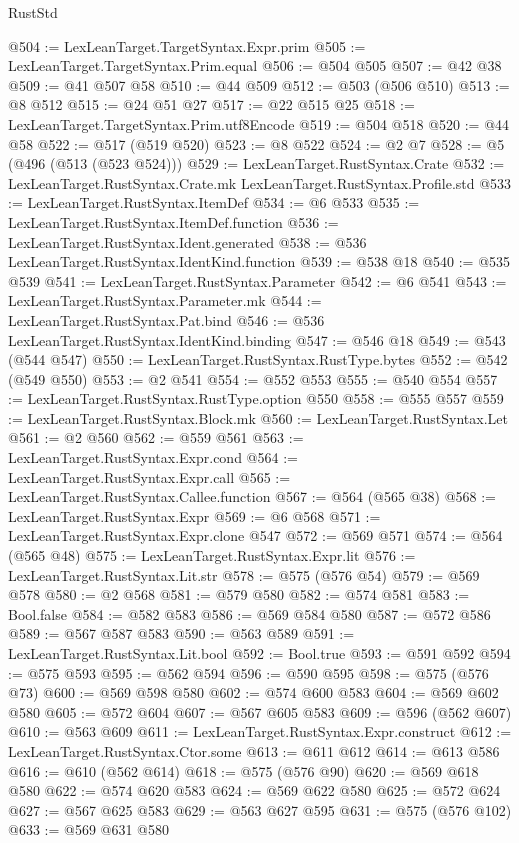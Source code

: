 \begin{lexlean}{RustStd}
\begin{coremodule}
@504 := LexLeanTarget.TargetSyntax.Expr.prim
@505 := LexLeanTarget.TargetSyntax.Prim.equal
@506 := @504 @505
@507 := @42 @38
@509 := @41 @507 @58
@510 := @44 @509
@512 := @503 (@506 @510)
@513 := @8 @512
@515 := @24 @51 @27
@517 := @22 @515 @25
@518 := LexLeanTarget.TargetSyntax.Prim.utf8Encode
@519 := @504 @518
@520 := @44 @58
@522 := @517 (@519 @520)
@523 := @8 @522
@524 := @2 @7
@528 := @5 (@496 (@513 (@523 @524)))
@529 := LexLeanTarget.RustSyntax.Crate
@532 := LexLeanTarget.RustSyntax.Crate.mk LexLeanTarget.RustSyntax.Profile.std
@533 := LexLeanTarget.RustSyntax.ItemDef
@534 := @6 @533
@535 := LexLeanTarget.RustSyntax.ItemDef.function
@536 := LexLeanTarget.RustSyntax.Ident.generated
@538 := @536 LexLeanTarget.RustSyntax.IdentKind.function
@539 := @538 @18
@540 := @535 @539
@541 := LexLeanTarget.RustSyntax.Parameter
@542 := @6 @541
@543 := LexLeanTarget.RustSyntax.Parameter.mk
@544 := LexLeanTarget.RustSyntax.Pat.bind
@546 := @536 LexLeanTarget.RustSyntax.IdentKind.binding
@547 := @546 @18
@549 := @543 (@544 @547)
@550 := LexLeanTarget.RustSyntax.RustType.bytes
@552 := @542 (@549 @550)
@553 := @2 @541
@554 := @552 @553
@555 := @540 @554
@557 := LexLeanTarget.RustSyntax.RustType.option @550
@558 := @555 @557
@559 := LexLeanTarget.RustSyntax.Block.mk
@560 := LexLeanTarget.RustSyntax.Let
@561 := @2 @560
@562 := @559 @561
@563 := LexLeanTarget.RustSyntax.Expr.cond
@564 := LexLeanTarget.RustSyntax.Expr.call
@565 := LexLeanTarget.RustSyntax.Callee.function
@567 := @564 (@565 @38)
@568 := LexLeanTarget.RustSyntax.Expr
@569 := @6 @568
@571 := LexLeanTarget.RustSyntax.Expr.clone @547
@572 := @569 @571
@574 := @564 (@565 @48)
@575 := LexLeanTarget.RustSyntax.Expr.lit
@576 := LexLeanTarget.RustSyntax.Lit.str
@578 := @575 (@576 @54)
@579 := @569 @578
@580 := @2 @568
@581 := @579 @580
@582 := @574 @581
@583 := Bool.false
@584 := @582 @583
@586 := @569 @584 @580
@587 := @572 @586
@589 := @567 @587 @583
@590 := @563 @589
@591 := LexLeanTarget.RustSyntax.Lit.bool
@592 := Bool.true
@593 := @591 @592
@594 := @575 @593
@595 := @562 @594
@596 := @590 @595
@598 := @575 (@576 @73)
@600 := @569 @598 @580
@602 := @574 @600 @583
@604 := @569 @602 @580
@605 := @572 @604
@607 := @567 @605 @583
@609 := @596 (@562 @607)
@610 := @563 @609
@611 := LexLeanTarget.RustSyntax.Expr.construct
@612 := LexLeanTarget.RustSyntax.Ctor.some
@613 := @611 @612
@614 := @613 @586
@616 := @610 (@562 @614)
@618 := @575 (@576 @90)
@620 := @569 @618 @580
@622 := @574 @620 @583
@624 := @569 @622 @580
@625 := @572 @624
@627 := @567 @625 @583
@629 := @563 @627 @595
@631 := @575 (@576 @102)
@633 := @569 @631 @580

\end{coremodule}
\end{lexlean}
